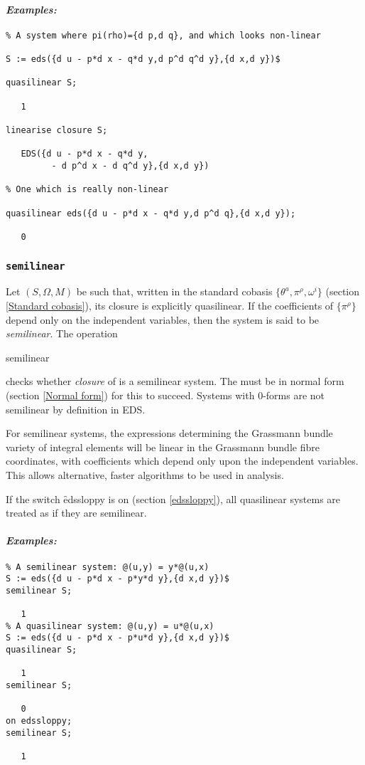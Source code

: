 \paragraph{\it Examples:}
\begin{verbatim}
% A system where pi(rho)={d p,d q}, and which looks non-linear

S := eds({d u - p*d x - q*d y,d p^d q^d y},{d x,d y})$

quasilinear S;

   1

linearise closure S;

   EDS({d u - p*d x - q*d y, 
         - d p^d x - d q^d y},{d x,d y})

% One which is really non-linear

quasilinear eds({d u - p*d x - q*d y,d p^d q},{d x,d y});

   0
\end{verbatim}

\subsubsection{\tt semilinear}
\label{semilinear}

Let $(S,\Omega,M)$ be such that, written in the standard cobasis
$\{\theta^a,\pi^\rho,\omega^i\}$ (section \ref{Standard cobasis}), its
closure is explicitly quasilinear. If the coefficients of $\{\pi^\rho\}$
depend only on the independent variables, then the system is said to be
{\em semilinear}.  The operation
\begin{edssyntax}
	semilinear 
\end{edssyntax}
checks whether {\em closure} of  is a semilinear system. The
 must be in normal form (section \ref{Normal form}) for this to
succeed. Systems with 0-forms are not semilinear by definition in EDS.

For semilinear systems, the expressions determining the Grassmann bundle
variety of integral elements will be linear in the Grassmann bundle fibre
coordinates, with coefficients which depend only upon the independent
variables. This allows alternative, faster algorithms to be used in
analysis.

If the switch \f{edssloppy} is on (section \ref{edssloppy}), all
quasilinear systems are treated as if they are semilinear.

\paragraph{\it Examples:}
\begin{verbatim}
% A semilinear system: @(u,y) = y*@(u,x)
S := eds({d u - p*d x - p*y*d y},{d x,d y})$
semilinear S;

   1
% A quasilinear system: @(u,y) = u*@(u,x)
S := eds({d u - p*d x - p*u*d y},{d x,d y})$
quasilinear S;

   1
semilinear S;

   0
on edssloppy;
semilinear S;

   1
\end{verbatim}

